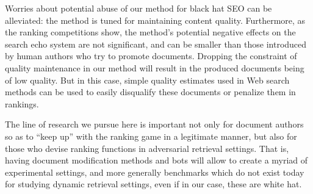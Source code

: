 Worries about potential abuse of our method for black hat SEO can be
alleviated: the method is tuned for maintaining content
quality. Furthermore, as the ranking competitions show, the method's
potential negative effects on the search echo system are not significant, and can be smaller than
those introduced by human authors who try to promote documents. Dropping the
constraint of quality maintenance in our method will result in the produced
documents being of low quality. But in this case, simple quality estimates used in Web
search methods \cite{Bendersky+al:11b} can be used to easily disqualify these documents or penalize them in rankings.



The line of research we pursue here 
is important not only for
document authors so as to ``keep up'' with the ranking game in a legitimate manner, but also for those who devise ranking functions in
adversarial retrieval settings. That is, having document modification
methods and bots will allow to create a myriad of experimental settings, and more
generally benchmarks which do not exist today for studying dynamic retrieval settings, even if in our case, these are white hat.

